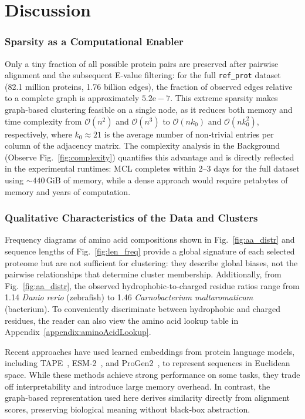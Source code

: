 \section{Discussion}

\subsubsection*{Sparsity as a Computational Enabler}

Only a tiny fraction of all possible protein pairs are preserved after
pairwise alignment and the subsequent E-value filtering: for the full \texttt{ref\_prot} dataset (82.1 million
proteins, 1.76 billion edges), the fraction of observed edges relative to a
complete graph is approximately \(5.2\text{e}-7\). This extreme sparsity makes
graph‑based clustering feasible on a single node, as it reduces both memory and
time complexity from \(\mathcal{O}(n^2)\) and \(\mathcal{O}(n^3)\) to
\(\mathcal{O}(n k_0)\) and \(\mathcal{O}(n k_0^2)\), respectively, where \(k_0
\approx 21\) is the average number of non‑trivial entries per column of the
adjacency matrix. The complexity analysis in the Background
(Observe Fig.~\ref{fig:complexity}) quantifies this advantage and is directly reflected
in the experimental runtimes: MCL completes within 2–3 days for the full
dataset using \(\sim 440\) GiB of memory, while a dense approach would
require petabytes of memory and years of computation.

\subsubsection*{Qualitative Characteristics of the Data and Clusters}

Frequency diagrams of amino acid compositions shown in Fig.~\ref{fig:aa_distr}
and sequence lengths of Fig.~\ref{fig:len_freq} provide a global signature of
each selected proteome but are not sufficient for clustering: they describe global
biases, not the pairwise relationships that determine cluster membership.
Additionally, from Fig.~\ref{fig:aa_distr}, the observed hydrophobic‑to‑charged
residue ratios range from 1.14 \textit{Danio rerio} (zebrafish) to 1.46
\textit{Carnobacterium maltaromaticum} (bacterium). To conveniently
discriminate between hydrophobic and charged residues, the reader can also view
the amino acid lookup table in Appendix~\ref{appendix:aminoAcidLookup}. 

Recent approaches have used learned embeddings from protein language models,
including TAPE~\cite{rao2019transformer}, ESM-2~\cite{lin2022esm2}, and
ProGen2~\cite{nijkamp2022progen2}, to represent sequences in Euclidean space.
While these methods achieve strong performance on some tasks, they trade off
interpretability and introduce large memory overhead. In contrast, the
graph‑based representation used here derives similarity directly from alignment
scores, preserving biological meaning without black‑box abstraction.

